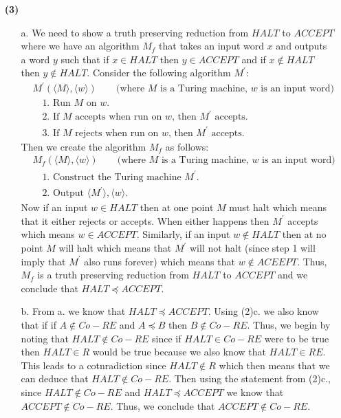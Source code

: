 \documentclass [10pt]{article}
\newcommand{\reduces}{\preceq}%
\begin{document}
\begin{enumerate}
\begin{enumerate}
	\end{enumerate}
	\item[\textbf{(3)}]
	\begin{enumerate}
		\item[a.]We need to show a truth preserving reduction from $HALT$ to $ACCEPT$ where we have an algorithm $M_{f}$ that takes an input word $x$ and outputs a word $y$ such that if $x\in HALT$ then $y\in ACCEPT$ and if $x\notin HALT$ then $y\notin HALT$. Consider the following algorithm $M^{\prime}$:
		\begin{align}
			&\text{$M^{\prime}(\langle M\rangle, \langle w\rangle)$}\qquad\text{(where $M$ is a Turing machine, $w$ is an input word)}\nonumber\\
			&\quad\text{1. Run $M$ on $w$.}\nonumber\\
			&\quad\text{2. If $M$ accepts when run on $w$, then $M^{\prime}$ accepts.}\nonumber\\
			&\quad\text{3. If $M$ rejects when run on $w$, then $M^{\prime}$ accepts.}\nonumber
		\end{align}
		Then we create the algorithm $M_{f}$ as follows:
		\begin{align}
			&\text{$M_f(\langle M\rangle, \langle w\rangle)$}\qquad\text{(where $M$ is a Turing machine, $w$ is an input word)}\nonumber\\
			&\quad\text{1. Construct the Turing machine $M^{\prime}$.}\nonumber\\
			&\quad\text{2. Output $\langle M^{\prime}\rangle, \langle w\rangle$.}\nonumber
		\end{align}
		Now if an input $w\in HALT$ then at one point $M$ must halt which means that it either rejects or accepts. When either happens then $M^{\prime}$ accepts which means $w\in ACCEPT$. Similarly, if an input $w\notin HALT$ then at no point $M$ will halt which means that $M^{\prime}$ will not halt (since step 1 will imply that $M^{\prime}$ also runs forever) which means that $w\notin ACEEPT$. Thus, $M_{f}$ is a truth preserving reduction from $HALT$ to $ACCEPT$ and we conclude that $HALT\reduces ACCEPT$.
		\item[b.]From a. we know that $HALT\reduces ACCEPT$. Using (2)c. we also know that if if $A\notin Co-RE$ and $A\reduces B$ then $B\notin Co-RE$. Thus, we begin by noting that $HALT\notin Co-RE$ since if $HALT\in Co-RE$ were to be true then $HALT\in R$ would be true because we also know that $HALT\in RE$. This leads to a cotnradiction since $HALT\notin R$ which then means that we can deduce that $HALT\notin Co-RE$. Then using the statement from (2)c., since $HALT\notin Co-RE$ and $HALT\reduces ACCEPT$ we know that $ACCEPT\notin Co-RE$. Thus, we conclude that $ACCEPT\notin Co-RE$.

\end{enumerate}
\end{enumerate}
\end{document}
